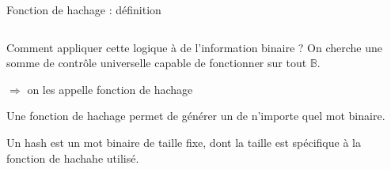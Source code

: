 \begin{frame}{Fonction de hachage : définition}
  \begin{columns}
    \begin{column}{0.7\textwidth}
      Comment appliquer cette logique à de l'information binaire ?
      On cherche une somme de contrôle universelle capable de fonctionner sur tout $\mathbb{B}$.

      $\Rightarrow$ on les appelle fonction de hachage

      \begin{definition}
        Une fonction de hachage permet de générer un  de n'importe quel mot binaire.
      \end{definition}

      \begin{definition}
        Un hash est un mot binaire de taille fixe, dont la taille est spécifique à la fonction de hachahe utilisé.
      \end{definition}
    \end{column}
    \begin{column}{0.2\textwidth}
    \end{column}
  \end{columns}
\end{frame}

